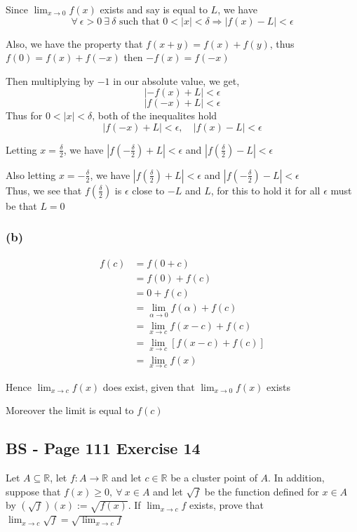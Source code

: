 \documentclass{article}
\begin{document}
Since \(\lim_{x\to 0}{f(x)}\) exists and say is equal to \(L\), we have
\[
\forall \ \epsilon > 0 \ \exists \ \delta \text{ such that } 0 < |x| < \delta \Rightarrow |f(x) - L| < \epsilon 
\]

Also, we have the property that \(f(x+y) = f(x) + f(y)\), thus \(f(0) = f(x) + f(-x)\) then \(-f(x) = f(-x)\)

Then multiplying by \(-1\) in our absolute value, we get,
\[
|-f(x) + L| < \epsilon
\]
\[
|f(-x) + L| < \epsilon 
\]
Thus for \(0 < |x| < \delta\), both of the inequalites hold
\[
|f(-x) + L| < \epsilon, \quad |f(x) - L| < \epsilon 
\]

Letting \(x = \frac{\delta}{2}\), we have \(|f(-\frac{\delta}{2}) + L| < \epsilon \) and \(|f(\frac{\delta}{2}) - L| < \epsilon \)

Also letting \(x = - \frac{\delta}{2}\), we have \(|f(\frac{\delta}{2}) + L| < \epsilon \) and \(|f(-\frac{\delta}{2}) - L| < \epsilon \)
\\

Thus, we see that \(f(\frac{\delta}{2})\) is \(\epsilon\) close to \(-L\) and \(L\), for this to hold it for all \(\epsilon\) must be that \(L = 0\)

\subsubsection*{(b)}

\begin{align*}
    f(c) &= f(0 + c) \\
    &= f(0) + f(c) \\
    &= 0 + f(c) \\
    &= \lim_{\alpha \to 0}{f(\alpha)}  + f(c)\\
    &= \lim_{x\to c}{f(x - c)} + f(c) \\
    &= \lim_{x\to c}{[f(x- c) + f(c)]} \\
    &= \lim_{x\to c}{f(x)}
\end{align*}

Hence \(\lim_{x\to c}{f(x)}\) does exist, given that \(\lim_{x\to 0}{f(x)}\) exists

Moreover the limit is equal to \(f(c)\)



\subsection*{BS - Page 111 Exercise 14}
Let \(A \subseteq \mathbb{R}\), let \(f: A \rightarrow \mathbb{R}\) and let \(c \in \mathbb{R}\)
be a cluster point of \(A\). In addition, suppose that \(f(x) \geq 0, \ \forall \ x \in A\)
and let \(\sqrt{f}\) be the function defined for \(x \in A\) by \((\sqrt{f})(x) := \sqrt{f(x)}\).
If \(\lim_{x\to c}{f}\) exists, prove that \(\lim_{x\to c}{\sqrt{f}} = \sqrt{\lim_{x\to c}{f}}\)
\end{document}
